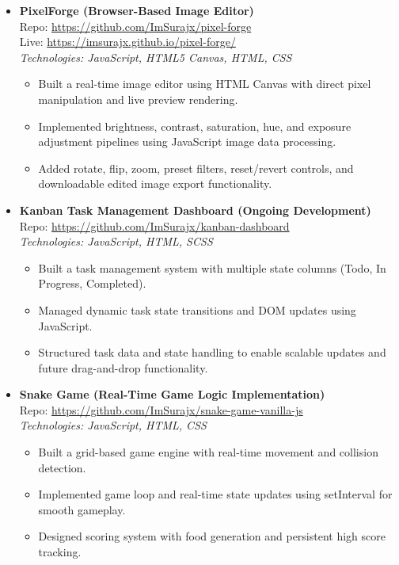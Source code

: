 \begin{itemize}
	
	\item \textbf{PixelForge (Browser-Based Image Editor)} \\
	      Repo: \href{https://github.com/ImSurajx/pixel-forge}{https://github.com/ImSurajx/pixel-forge} \\
	      Live: \href{https://imsurajx.github.io/pixel-forge/}{https://imsurajx.github.io/pixel-forge/} \\
	      \textit{Technologies: JavaScript, HTML5 Canvas, HTML, CSS}
	      
	      \begin{itemize}
	      	\item Built a real-time image editor using HTML Canvas with direct pixel manipulation and live preview rendering.
	      	\item Implemented brightness, contrast, saturation, hue, and exposure adjustment pipelines using JavaScript image data processing.
	      	\item Added rotate, flip, zoom, preset filters, reset/revert controls, and downloadable edited image export functionality.
	      \end{itemize}

    \item \textbf{Kanban Task Management Dashboard (Ongoing Development)} \\
	      Repo: \href{https://github.com/ImSurajx/kanban-dashboard}{https://github.com/ImSurajx/kanban-dashboard} \\
	      \textit{Technologies: JavaScript, HTML, SCSS}
	      
	      \begin{itemize}
	      	\item Built a task management system with multiple state columns (Todo, In Progress, Completed).
	      	\item Managed dynamic task state transitions and DOM updates using JavaScript.
	      	\item Structured task data and state handling to enable scalable updates and future drag-and-drop functionality.
	      \end{itemize}

	\item \textbf{Snake Game (Real-Time Game Logic Implementation)} \\
	      Repo: \href{https://github.com/ImSurajx/snake-game-vanilla-js}{https://github.com/ImSurajx/snake-game-vanilla-js} \\
	      \textit{Technologies: JavaScript, HTML, CSS}
	      
	      \begin{itemize}
	      	\item Built a grid-based game engine with real-time movement and collision detection.
	      	\item Implemented game loop and real-time state updates using setInterval for smooth gameplay.
	      	\item Designed scoring system with food generation and persistent high score tracking.
	      \end{itemize}

\end{itemize}
